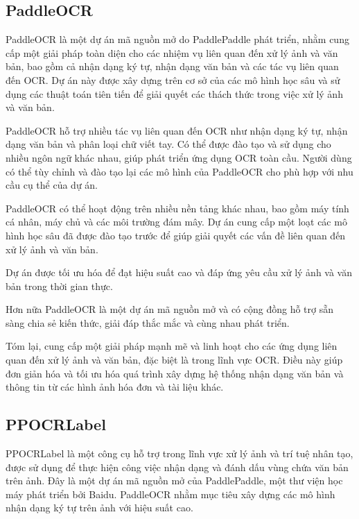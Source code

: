 \subsection{PaddleOCR}
PaddleOCR là một dự án mã nguồn mở do PaddlePaddle phát triển, nhằm cung cấp một giải pháp toàn diện cho các nhiệm vụ liên quan đến xử lý ảnh và văn bản, bao gồm cả nhận dạng ký tự, nhận dạng văn bản và các tác vụ liên quan đến OCR. Dự án này được xây dựng trên cơ sở của các mô hình học sâu và sử dụng các thuật toán tiên tiến để giải quyết các thách thức trong việc xử lý ảnh và văn bản.

PaddleOCR hỗ trợ nhiều tác vụ liên quan đến OCR như nhận dạng ký tự, nhận dạng văn bản và phân loại chữ viết tay. Có thể được đào tạo và sử dụng cho nhiều ngôn ngữ khác nhau, giúp phát triển ứng dụng OCR toàn cầu. Người dùng có thể tùy chỉnh và đào tạo lại các mô hình của PaddleOCR cho phù hợp với nhu cầu cụ thể của dự án.

PaddleOCR có thể hoạt động trên nhiều nền tảng khác nhau, bao gồm máy tính cá nhân, máy chủ và các môi trường đám mây. Dự án cung cấp một loạt các mô hình học sâu đã được đào tạo trước để giúp giải quyết các vấn đề liên quan đến xử lý ảnh và văn bản.

Dự án được tối ưu hóa để đạt hiệu suất cao và đáp ứng yêu cầu xử lý ảnh và văn bản trong thời gian thực.

Hơn nữa PaddleOCR là một dự án mã nguồn mở và có cộng đồng hỗ trợ sẵn sàng chia sẻ kiến thức, giải đáp thắc mắc và cùng nhau phát triển.

Tóm lại, cung cấp một giải pháp mạnh mẽ và linh hoạt cho các ứng dụng liên quan đến xử lý ảnh và văn bản, đặc biệt là trong lĩnh vực OCR. Điều này giúp đơn giản hóa và tối ưu hóa quá trình xây dựng hệ thống nhận dạng văn bản và thông tin từ các hình ảnh hóa đơn và tài liệu khác.

\subsection{PPOCRLabel}
PPOCRLabel là một công cụ hỗ trợ trong lĩnh vực xử lý ảnh và trí tuệ nhân tạo, được sử dụng để thực hiện công việc nhận dạng và đánh dấu vùng chứa văn bản trên ảnh. Đây là một dự án mã nguồn mở của PaddlePaddle, một thư viện học máy phát triển bởi Baidu. PaddleOCR nhằm mục tiêu xây dựng các mô hình nhận dạng ký tự trên ảnh với hiệu suất cao.

